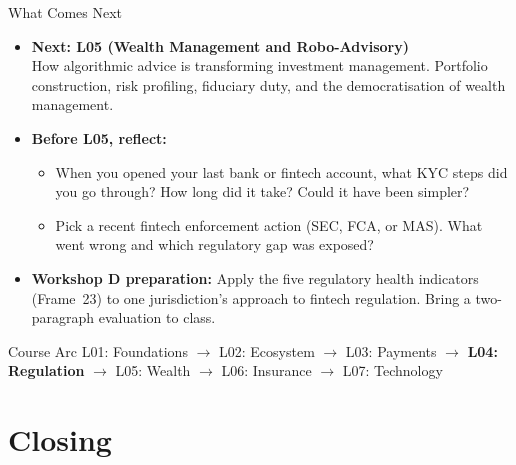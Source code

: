 \begin{frame}{What Comes Next}
  \begin{itemize}
    \item \textcolor{mlpurple}{\textbf{Next: L05 (Wealth Management and Robo-Advisory)}} \\
          How algorithmic advice is transforming investment management.
          Portfolio construction, risk profiling, fiduciary duty, and the
          democratisation of wealth management.
    \vspace{0.4em}
    \item \textcolor{mlblue}{\textbf{Before L05, reflect:}}
      \begin{itemize}
        \item When you opened your last bank or fintech account, what KYC steps
              did you go through? How long did it take? Could it have been simpler?
        \item Pick a recent fintech enforcement action (SEC, FCA, or MAS).
              What went wrong and which regulatory gap was exposed?
      \end{itemize}
    \vspace{0.4em}
    \item \textcolor{mlgreen}{\textbf{Workshop D preparation:}}
      Apply the five regulatory health indicators (Frame~23) to one jurisdiction's
      approach to fintech regulation. Bring a two-paragraph evaluation to class.
  \end{itemize}
  \vspace{0.4em}
  \begin{block}{Course Arc}
    L01: Foundations $\to$ L02: Ecosystem $\to$ L03: Payments $\to$
    \textbf{L04: Regulation} $\to$ L05: Wealth $\to$ L06: Insurance $\to$ L07: Technology
  \end{block}
\end{frame}


\section{Closing}

